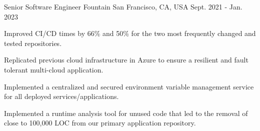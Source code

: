 

\begin{cventries}

  \cventry
  {Senior Software Engineer} %
  {Fountain} %
  {San Francisco, CA, USA} %
  {Sept. 2021 - Jan. 2023} %
  {
    \begin{cvitems} %
      \item {Improved CI/CD times by 66\% and 50\% for the two most frequently changed and tested repositories.}
      \item {Replicated previous cloud infrastructure in Azure to ensure a resilient and fault tolerant multi-cloud application.}
      \item {Implemented a centralized and secured environment variable management service for all deployed services/applications.}
      \item {Implemented a runtime analysis tool for unused code that led to the removal of close to 100,000 LOC from our primary application repository.}
    \end{cvitems}
  }



\end{cventries}

